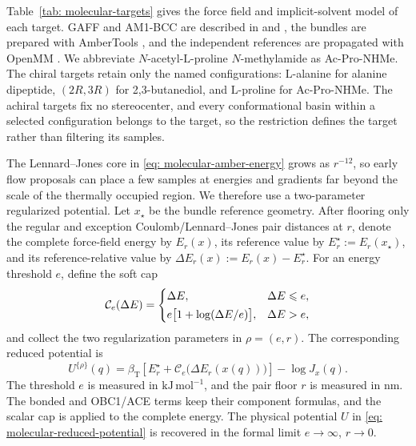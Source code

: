 \documentclass{article}
\begin{document}
Table~\ref{tab: molecular-targets} gives the force field and implicit-solvent model of each target. GAFF and AM1-BCC are described in \citet{wang2004gaff} and \citet{jakalian2002am1bcc}, the bundles are prepared with AmberTools \citep{case2023ambertools}, and the independent references are propagated with OpenMM \citep{eastman2017openmm}. We abbreviate \(N\)-acetyl-\(\mathrm L\)-proline \(N\)-methylamide as Ac-Pro-NHMe. The chiral targets retain only the named configurations: \(\mathrm L\)-alanine for alanine dipeptide, \((2R,3R)\) for 2,3-butanediol, and \(\mathrm L\)-proline for Ac-Pro-NHMe. The achiral targets fix no stereocenter, and every conformational basin within a selected configuration belongs to the target, so the restriction defines the target rather than filtering its samples.

The Lennard--Jones core in \eqref{eq: molecular-amber-energy} grows as \(r^{-12}\), so early flow proposals can place a few samples at energies and gradients far beyond the scale of the thermally occupied region. We therefore use a two-parameter regularized potential. Let \(x_\star\) be the bundle reference geometry. After flooring only the regular and exception Coulomb/Lennard--Jones pair distances at \(r\), denote the complete force-field energy by \(E_r(x)\), its reference value by \(E_r^\star:=E_r(x_\star)\), and its reference-relative value by \(\Delta E_r(x):=E_r(x)-E_r^\star\). For an energy threshold \(e\), define the soft cap
\begin{equation}
\mathcal C_e(\Delta E)=
\begin{cases}
\Delta E, & \Delta E\leqslant e,\\[2pt]
e\bigl[1+\log(\Delta E/e)\bigr], & \Delta E>e,
\end{cases}
\label{eq: molecular-regularizer}
\end{equation}
and collect the two regularization parameters in \(\rho=(e,r)\). The corresponding reduced potential is
\begin{equation}
U^{\{\rho\}}(q)
=\beta_{\mathrm T}\!\left[E_r^\star
+\mathcal C_e\bigl(\Delta E_r(x(q))\bigr)\right]-\log J_x(q).
\label{eq: regularized-molecular-potential}
\end{equation}
The threshold \(e\) is measured in \(\mathrm{kJ\,mol^{-1}}\), and the pair floor \(r\) is measured in \(\mathrm{nm}\). The bonded and OBC1/ACE terms keep their component formulas, and the scalar cap is applied to the complete energy. The physical potential \(U\) in \eqref{eq: molecular-reduced-potential} is recovered in the formal limit \(e\to\infty\), \(r\to0\).
\end{document}

